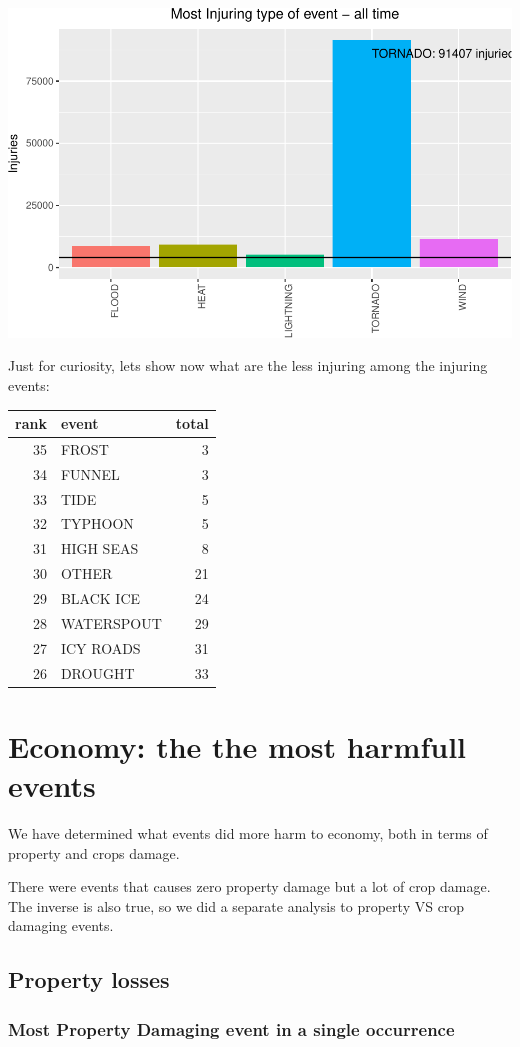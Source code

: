 \documentclass[]{article}
\begin{document}
\includegraphics{readme_files/figure-latex/injuring-all-plot-1.pdf}

Just for curiosity, lets show now what are the less injuring among the
injuring events:

\begin{longtable}[]{@{}rlr@{}}
\toprule
rank & event & total\tabularnewline
\midrule
\endhead
35 & FROST & 3\tabularnewline
34 & FUNNEL & 3\tabularnewline
33 & TIDE & 5\tabularnewline
32 & TYPHOON & 5\tabularnewline
31 & HIGH SEAS & 8\tabularnewline
30 & OTHER & 21\tabularnewline
29 & BLACK ICE & 24\tabularnewline
28 & WATERSPOUT & 29\tabularnewline
27 & ICY ROADS & 31\tabularnewline
26 & DROUGHT & 33\tabularnewline
\bottomrule
\end{longtable}

\section{Economy: the the most harmfull
events}\label{economy-the-the-most-harmfull-events}

We have determined what events did more harm to economy, both in terms
of property and crops damage.

There were events that causes zero property damage but a lot of crop
damage. The inverse is also true, so we did a separate analysis to
property VS crop damaging events.

\subsection{Property losses}\label{property-losses}

\subsubsection{Most Property Damaging event in a single
occurrence}\label{most-property-damaging-event-in-a-single-occurrence}
\end{document}
